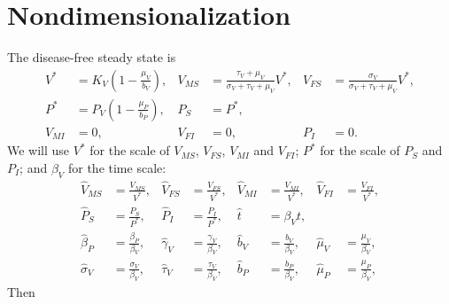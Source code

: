 \documentclass{article}
\begin{document}
\section{Nondimensionalization}

The disease-free steady state is
\begin{align}
  V^* &= K_V \left(1 - \frac{\mu_V}{b_V}\right),
  &
  V_{MS} &= \frac{\tau_V + \mu_V}{\sigma_V + \tau_V + \mu_V} V^*,
  &
  V_{FS} &= \frac{\sigma_V}{\sigma_V + \tau_V + \mu_V} V^*,
  \\
  P^* &= P_V \left(1 - \frac{\mu_P}{b_P}\right),
  &
  P_S &= P^*,
  \\
  V_{MI} &= 0,
  &
  V_{FI} &= 0,
  &
  P_I &= 0.
\end{align}
We will use $V^*$ for the scale of $V_{MS}$, $V_{FS}$, $V_{MI}$ and
$V_{FI}$; $P^*$ for the scale of $P_S$ and $P_I$; and $\beta_V$ for
the time scale:
\begin{equation}
  \begin{aligned}
    \hat{V}_{MS} &= \frac{V_{MS}}{V^*},
    &
    \hat{V}_{FS} &= \frac{V_{FS}}{V^*},
    &
    \hat{V}_{MI} &= \frac{V_{MI}}{V^*},
    &
    \hat{V}_{FI} &= \frac{V_{FI}}{V^*},
    \\
    \hat{P}_S &= \frac{P_S}{P^*},
    &
    \hat{P}_I &= \frac{P_I}{P^*},
    &
    \hat{t} &= \beta_V t,
    \\
    \hat{\beta}_P &= \frac{\beta_P}{\beta_V},
    &
    \hat{\gamma}_V &= \frac{\gamma_V}{\beta_V},
    &
    \hat{b}_V &= \frac{b_V}{\beta_V},
    &
    \hat{\mu}_V &= \frac{\mu_V}{\beta_V},
    \\
    \hat{\sigma}_V &= \frac{\sigma_V}{\beta_V},
    &
    \hat{\tau}_V &= \frac{\tau_V}{\beta_V},
    &
    \hat{b}_P &= \frac{b_P}{\beta_V},
    &
    \hat{\mu}_P &= \frac{\mu_P}{\beta_V},
  \end{aligned}
\end{equation}
Then
\end{document}
